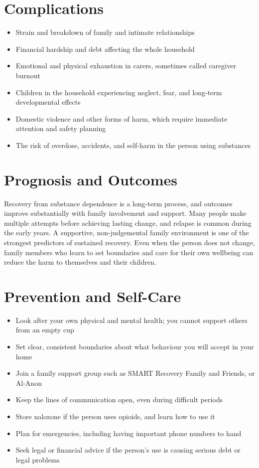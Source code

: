 \section*{Complications}
\begin{itemize}
    \item Strain and breakdown of family and intimate relationships
    \item Financial hardship and debt affecting the whole household
    \item Emotional and physical exhaustion in carers, sometimes called caregiver burnout
    \item Children in the household experiencing neglect, fear, and long-term developmental effects
    \item Domestic violence and other forms of harm, which require immediate attention and safety planning
    \item The risk of overdose, accidents, and self-harm in the person using substances
\end{itemize}

\section*{Prognosis and Outcomes}
Recovery from substance dependence is a long-term process, and outcomes improve substantially with family involvement and support. Many people make multiple attempts before achieving lasting change, and relapse is common during the early years. A supportive, non-judgemental family environment is one of the strongest predictors of sustained recovery. Even when the person does not change, family members who learn to set boundaries and care for their own wellbeing can reduce the harm to themselves and their children.

\section*{Prevention and Self-Care}
\begin{itemize}
    \item Look after your own physical and mental health; you cannot support others from an empty cup
    \item Set clear, consistent boundaries about what behaviour you will accept in your home
    \item Join a family support group such as SMART Recovery Family and Friends, or Al-Anon
    \item Keep the lines of communication open, even during difficult periods
    \item Store naloxone if the person uses opioids, and learn how to use it
    \item Plan for emergencies, including having important phone numbers to hand
    \item Seek legal or financial advice if the person's use is causing serious debt or legal problems
\end{itemize}

